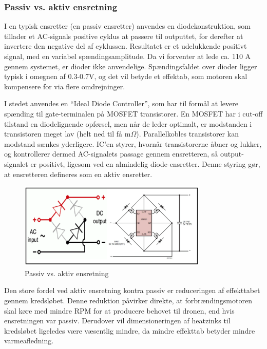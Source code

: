 \subsubsection{Passiv vs. aktiv ensretning}
\label{sec:passiv-vs.-aktiv}

I en typisk ensretter (en passiv ensretter) anvendes en diodekonstruktion, som tillader et AC-signals positive cyklus at passere til outputtet, for derefter at invertere den negative del af cyklussen. Resultatet er et udelukkende positivt signal, med en variabel spændingsamplitude. Da vi forventer at lede ca. 110 A gennem systemet, er dioder ikke anvendelige. Spændingsfaldet over dioder ligger typisk i omegnen af 0.3-0.7V, og det vil betyde et effektab, som motoren skal kompensere for via flere omdrejninger.

I stedet anvendes en “Ideal Diode Controller”, som har til formål at levere spænding til gate-terminalen på MOSFET transistorer. En MOSFET har i cut-off tilstand en diodelignende opførsel, men når de leder optimalt, er modstanden i transistoren meget lav (helt ned til få m$\Omega$). Parallelkobles transistorer kan modstand sænkes yderligere. IC’en styrer, hvornår transistorerne åbner og lukker, og kontrollerer dermed AC-signalets passage gennem ensretteren, så output-signalet er positivt, ligesom ved en almindelig diode-ensretter. Denne styring gør, at ensretteren defineres som en aktiv ensretter.

\begin{figure}[h]
  \centering
  \includegraphics[width=0.8\textwidth]{prens1.png}
  \caption{Passiv vs. aktiv ensretning}
  \label{fig:prens1}
\end{figure}

Den store fordel ved aktiv ensretning kontra passiv er reduceringen af effekttabet gennem kredsløbet. Denne reduktion påvirker direkte, at forbrændingsmotoren skal køre med mindre RPM for at producere behovet til dronen, end hvis ensretningen var passiv. Derudover vil dimensioneringen af heatzinks til kredsløbet ligeledes være væsentlig mindre, da mindre effekttab betyder mindre varmeafledning.  
  
